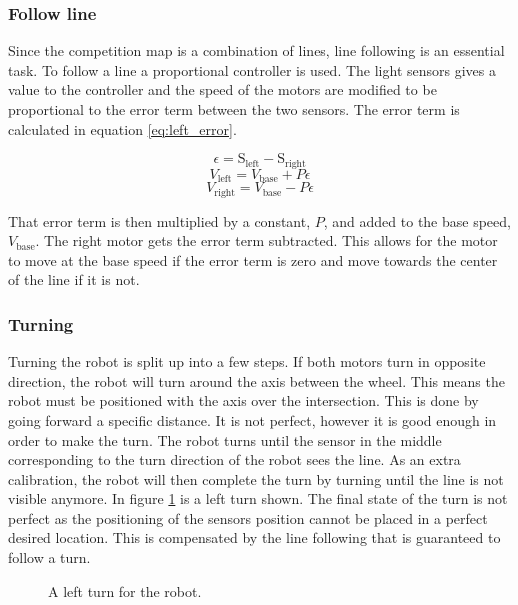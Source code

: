 \subsubsection{Follow line}
Since the competition map is a combination of lines, line following is an essential task.
To follow a line a proportional controller is used.
The light sensors gives a value to the controller and the speed of the motors are modified to be proportional to the error term between the two sensors.
The error term is calculated in equation \ref{eq:left_error}.

\begin{equation}
  \epsilon = \text{S}_{\text{left}} - \text{S}_{\text{right}}
 \label{eq:left_error}
\end{equation}
\begin{equation}
  V_\text{left} = V_\text{base} + P \epsilon
 \label{eq:left_speed}
\end{equation}
\begin{equation}
  V_\text{right} = V_\text{base} - P \epsilon
 \label{eq:right_speed}
\end{equation}

That error term is then multiplied by a constant, $P$, and added to the base speed, $V_\text{base}$.
The right motor gets the error term subtracted.
This allows for the motor to move at the base speed if the error term is zero and move towards the center of the line if it is not.

\subsubsection{Turning}
Turning the robot is split up into a few steps.
If both motors turn in opposite direction, the robot will turn around the axis between the wheel.
This means the robot must be positioned with the axis over the intersection.
This is done by going forward a specific distance.
It is not perfect, however it is good enough in order to make the turn.
The robot turns until the sensor in the middle corresponding to the turn direction of the robot sees the line.
As an extra calibration, the robot will then complete the turn by turning until the line is not visible anymore.
In figure \ref{fig:left_turn} is a left turn shown.
The final state of the turn is not perfect as the positioning of the sensors position cannot be placed in a perfect desired location.
This is compensated by the line following that is guaranteed to follow a turn.

\begin{figure}[H]

 \caption{A left turn for the robot.}
 \label{fig:left_turn}
\end{figure}

